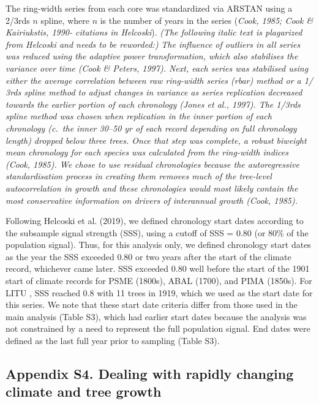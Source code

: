\documentclass[
]{article}
\begin{document}
The ring-width series from each core was standardized via ARSTAN using a
2/3rds \(n\) spline, where \(n\) is the number of years in the series
(\emph{Cook, 1985; Cook \& Kairiukstis, 1990- citations in Helcoski}).
\emph{(The following italic text is plagarized from Helcoski and needs
to be reworded:)} \emph{The influence of outliers in all series was
reduced using the adaptive power transformation, which also stabilises
the variance over time (Cook \& Peters, 1997). Next, each series was
stabilised using either the average correlation between raw ring-width
series (rbar) method or a 1/ 3rds spline method to adjust changes in
variance as series replication decreased towards the earlier portion of
each chronology (Jones et al., 1997). The 1/3rds spline method was
chosen when replication in the inner portion of each chronology (c.~the
inner 30--50 yr of each record depending on full chronology length)
dropped below three trees. Once that step was complete, a robust
biweight mean chronology for each species was calculated from the
ring-width indices (Cook, 1985). We chose to use residual chronologies
because the autoregressive standardisation process in creating them
removes much of the tree-level autocorrelation in growth and these
chronologies would most likely contain the most conservative information
on drivers of interannual growth (Cook, 1985).}

Following Helcoski et al. (2019), we defined chronology start dates
according to the subsample signal strength (SSS), using a cutoff of SSS
= 0.80 (or 80\% of the population signal). Thus, for this analysis only,
we defined chronology start dates as the year the SSS exceeded 0.80 or
two years after the start of the climate record, whichever came later.
SSS exceeded 0.80 well before the start of the 1901 start of climate
records for PSME (1800s), ABAL (1700), and PIMA (1850s). For LITU , SSS
reached 0.8 with 11 trees in 1919, which we used as the start date for
this series. We note that these start date criteria differ from those
used in the main analysis (Table S3), which had earlier start dates
because the analysis was not constrained by a need to represent the full
population signal. End dates were defined as the last full year prior to
sampling (Table S3).

\newpage

\hypertarget{appendix-s4.-dealing-with-rapidly-changing-climate-and-tree-growth}{%
\subsection{Appendix S4. Dealing with rapidly changing climate and tree
growth}\label{appendix-s4.-dealing-with-rapidly-changing-climate-and-tree-growth}}
\end{document}
